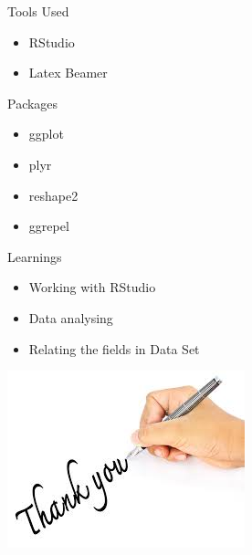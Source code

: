 \documentclass[14pt]{beamer}
\begin{document}
\begin{frame}{Tools Used}
\begin{itemize}
    \item RStudio
    \item Latex Beamer

\end{itemize}
\end{frame}



\begin{frame}{Packages}
\begin{itemize}
    \item ggplot
    \item plyr
    \item reshape2
    \item ggrepel
\end{itemize}
\end{frame}


\begin{frame}{Learnings}
\begin{itemize}
    \item Working with RStudio
    \item Data analysing
    \item Relating the fields in Data Set 
\end{itemize}
\end{frame}

\begin{frame}
  \begin{center}
    \includegraphics[scale=0.8]{tnk_u.jpg}
  \end{center}
\end{frame}
\end{document}
